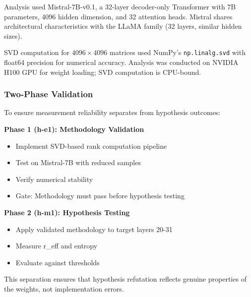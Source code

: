 Analysis used Mistral-7B-v0.1, a 32-layer decoder-only Transformer with 7B parameters, 4096 hidden dimension, and 32 attention heads. Mistral shares architectural characteristics with the LLaMA family (32 layers, similar hidden sizes).

SVD computation for $4096\times 4096$ matrices used NumPy's \texttt{np.linalg.svd} with float64 precision for numerical accuracy. Analysis was conducted on NVIDIA H100 GPU for weight loading; SVD computation is CPU-bound.

\subsubsection{Two-Phase Validation}

To ensure measurement reliability separates from hypothesis outcomes:

\textbf{Phase 1 (h-e1): Methodology Validation}
\begin{itemize}
\item Implement SVD-based rank computation pipeline
\item Test on Mistral-7B with reduced samples
\item Verify numerical stability
\item Gate: Methodology must pass before hypothesis testing
\end{itemize}

\textbf{Phase 2 (h-m1): Hypothesis Testing}
\begin{itemize}
\item Apply validated methodology to target layers 20-31
\item Measure r\_eff and entropy
\item Evaluate against thresholds
\end{itemize}

This separation ensures that hypothesis refutation reflects genuine properties of the weights, not implementation errors.
